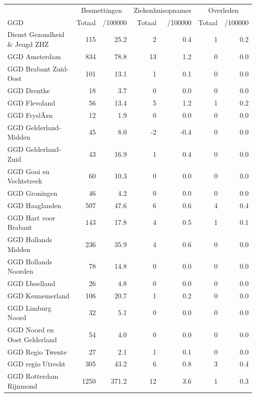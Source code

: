 \documentclass[
  english,
  man,floatsintext]{apa6}
\begin{document}
\begin{table}[H]
\centering\begingroup\fontsize{10}{12}\selectfont

\begin{threeparttable}
\begin{tabular}{lrrrrrr}
\toprule
\multicolumn{1}{c}{ } & \multicolumn{2}{c}{Besmettingen} & \multicolumn{2}{c}{Ziekenhuisopnames} & \multicolumn{2}{c}{Overleden} \\
\cmidrule(l{3pt}r{3pt}){2-3} \cmidrule(l{3pt}r{3pt}){4-5} \cmidrule(l{3pt}r{3pt}){6-7}
GGD & Totaal & /100000 & Totaal & /100000 & Totaal & /100000\\
\midrule
Dienst Gezondheid \& Jeugd ZHZ & 115 & 25.2 & 2 & 0.4 & 1 & 0.2\\
GGD Amsterdam & 834 & 78.8 & 13 & 1.2 & 0 & 0.0\\
GGD Brabant Zuid-Oost & 101 & 13.1 & 1 & 0.1 & 0 & 0.0\\
GGD Drenthe & 18 & 3.7 & 0 & 0.0 & 0 & 0.0\\
GGD Flevoland & 56 & 13.4 & 5 & 1.2 & 1 & 0.2\\
GGD FryslÃ¢n & 12 & 1.9 & 0 & 0.0 & 0 & 0.0\\
GGD Gelderland-Midden & 45 & 8.0 & -2 & -0.4 & 0 & 0.0\\
GGD Gelderland-Zuid & 43 & 16.9 & 1 & 0.4 & 0 & 0.0\\
GGD Gooi en Vechtstreek & 60 & 10.3 & 0 & 0.0 & 0 & 0.0\\
GGD Groningen & 46 & 4.2 & 0 & 0.0 & 0 & 0.0\\
GGD Haaglanden & 507 & 47.6 & 6 & 0.6 & 4 & 0.4\\
GGD Hart voor Brabant & 143 & 17.8 & 4 & 0.5 & 1 & 0.1\\
GGD Hollands Midden & 236 & 35.9 & 4 & 0.6 & 0 & 0.0\\
GGD Hollands Noorden & 78 & 14.8 & 0 & 0.0 & 0 & 0.0\\
GGD IJsselland & 26 & 4.8 & 0 & 0.0 & 0 & 0.0\\
GGD Kennemerland & 106 & 20.7 & 1 & 0.2 & 0 & 0.0\\
GGD Limburg Noord & 32 & 5.1 & 0 & 0.0 & 0 & 0.0\\
GGD Noord en Oost Gelderland & 54 & 4.0 & 0 & 0.0 & 0 & 0.0\\
GGD Regio Twente & 27 & 2.1 & 1 & 0.1 & 0 & 0.0\\
GGD regio Utrecht & 305 & 43.2 & 6 & 0.8 & 3 & 0.4\\
GGD Rotterdam Rijnmond & 1250 & 371.2 & 12 & 3.6 & 1 & 0.3\\

\end{tabular}
\end{threeparttable}
\end{table}
\end{document}

